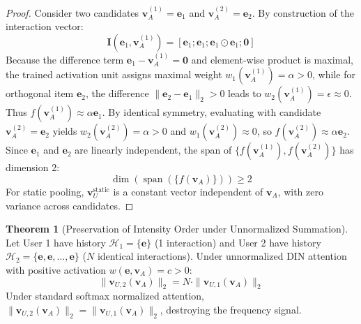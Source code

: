 \documentclass[11pt,a4paper]{article}
\theoremstyle{definition}
\newtheorem{theorem}{\textbf{Theorem}}[section]
\begin{document}
\begin{proof}
Consider two candidates $\mathbf{v}_A^{(1)} = \mathbf{e}_1$ and $\mathbf{v}_A^{(2)} = \mathbf{e}_2$.
By construction of the interaction vector:
{\boldmath
\begin{equation}
\mathbf{I}(\mathbf{e}_1, \mathbf{v}_A^{(1)}) = [\mathbf{e}_1; \mathbf{e}_1; \mathbf{e}_1 \odot \mathbf{e}_1; \mathbf{0}]
\end{equation}
}
Because the difference term $\mathbf{e}_1 - \mathbf{v}_A^{(1)} = \mathbf{0}$ and element-wise product is maximal, the trained activation unit assigns maximal weight $w_1(\mathbf{v}_A^{(1)}) = \alpha > 0$, while for orthogonal item $\mathbf{e}_2$, the difference $\|\mathbf{e}_2 - \mathbf{e}_1\|_2 > 0$ leads to $w_2(\mathbf{v}_A^{(1)}) = \epsilon \approx 0$.
Thus $f(\mathbf{v}_A^{(1)}) \approx \alpha \mathbf{e}_1$.
By identical symmetry, evaluating with candidate $\mathbf{v}_A^{(2)} = \mathbf{e}_2$ yields $w_2(\mathbf{v}_A^{(2)}) = \alpha > 0$ and $w_1(\mathbf{v}_A^{(2)}) \approx 0$, so $f(\mathbf{v}_A^{(2)}) \approx \alpha \mathbf{e}_2$.
Since $\mathbf{e}_1$ and $\mathbf{e}_2$ are linearly independent, the span of $\{f(\mathbf{v}_A^{(1)}), f(\mathbf{v}_A^{(2)})\}$ has dimension 2:
{\boldmath
\begin{equation}
\dim\left( \operatorname{span}\left( \{ f(\mathbf{v}_A) \} \right) \right) \ge 2
\end{equation}
}
For static pooling, $\mathbf{v}_U^{\text{static}}$ is a constant vector independent of $\mathbf{v}_A$, with zero variance across candidates.
\end{proof}

\begin{theorem}[Preservation of Intensity Order under Unnormalized Summation]
Let User 1 have history $\mathcal{H}_1 = \{\mathbf{e}\}$ (1 interaction) and User 2 have history $\mathcal{H}_2 = \{\mathbf{e}, \mathbf{e}, \dots, \mathbf{e}\}$ ($N$ identical interactions). Under unnormalized DIN attention with positive activation $w(\mathbf{e}, \mathbf{v}_A) = c > 0$:
{\boldmath
\begin{equation}
\|\mathbf{v}_{U, 2}(\mathbf{v}_A)\|_2 = N \cdot \|\mathbf{v}_{U, 1}(\mathbf{v}_A)\|_2
\end{equation}
}
Under standard softmax normalized attention, $\|\mathbf{v}_{U, 2}(\mathbf{v}_A)\|_2 = \|\mathbf{v}_{U, 1}(\mathbf{v}_A)\|_2$, destroying the frequency signal.
\end{theorem}
\end{document}

